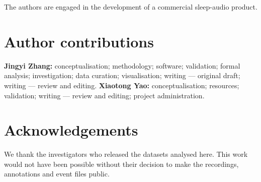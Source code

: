 The authors are engaged in the development of a commercial sleep-audio product.

\section*{Author contributions}

\textbf{Jingyi Zhang:} conceptualisation; methodology; software; validation;
formal analysis; investigation; data curation; visualisation; writing --- original
draft; writing --- review and editing.
\textbf{Xiaotong Yao:} conceptualisation; resources; validation; writing ---
review and editing; project administration.

\section*{Acknowledgements}

We thank the investigators who released the datasets analysed here. This work would
not have been possible without their decision to make the recordings, annotations
and event files public.



%
%



